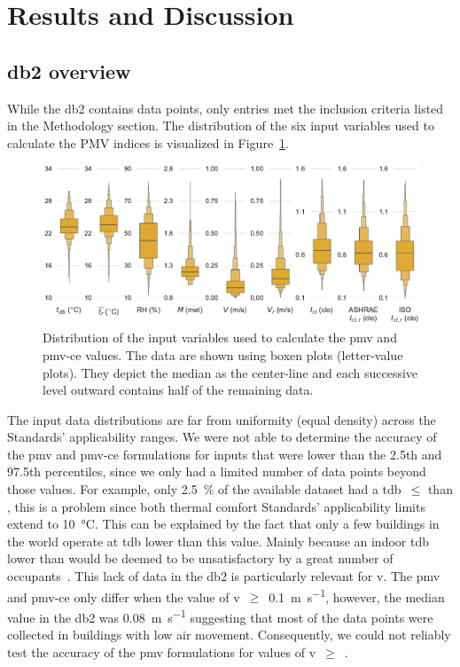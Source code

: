 \section{Results and Discussion}\label{sec:results}

\subsection{\ac{db2} overview}\label{subsec:comfort-db-overview}
While the \ac{db2} contains  data points, only  entries met the inclusion criteria listed in the Methodology section.
The distribution of the six input variables used to calculate the PMV indices is visualized in Figure~\ref{fig:dist_input_data}.
\begin{figure}[htb!]
    \centering
    \includegraphics[width=\textwidth]{figures/dist_input_data}
    \caption{Distribution of the input variables used to calculate the \ac{pmv} and \ac{pmv-ce} values.
    The data are shown using boxen plots (letter-value plots).
    They depict the median as the center-line and each successive level outward contains half of the remaining data.}
    \label{fig:dist_input_data}
\end{figure}
The input data distributions are far from uniformity (equal density) across the Standards' applicability ranges.
We were not able to determine the accuracy of the \ac{pmv} and \ac{pmv-ce} formulations for inputs that were lower than the 2.5th and 97.5th percentiles, since we only had a limited number of data points beyond those values.
For example, only \qty{2.5}{\percent} of the available dataset had a \ac{tdb}~$\leq$ than , this is a problem since both thermal comfort Standards' applicability limits extend to \qty{10}{\celsius}.
This can be explained by the fact that only a few buildings in the world operate at \ac{tdb} lower than this value.
Mainly because an indoor \ac{tdb} lower than  would be deemed to be unsatisfactory by a great number of occupants~\cite{iso7730}.
This lack of data in the \ac{db2} is particularly relevant for \ac{v}.
The \ac{pmv} and \ac{pmv-ce} only differ when the value of \ac{v}~$\geq$~\qty{0.1}{\m\per\s}, however, the median value in the \ac{db2} was \qty{0.08}{\m\per\s} suggesting that most of the data points were collected in buildings with low air movement.
Consequently, we could not reliably test the accuracy of the \ac{pmv} formulations for values of \ac{v}~$\geq$~.

